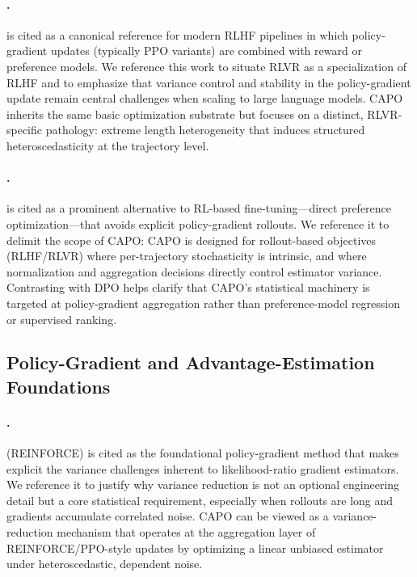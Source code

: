 \paragraph{\citet{ouyang2022instructgpt}.}
\citet{ouyang2022instructgpt} is cited as a canonical reference for modern RLHF pipelines in which policy-gradient updates (typically PPO variants) are combined with reward or preference models.
We reference this work to situate RLVR as a specialization of RLHF and to emphasize that variance control and stability in the policy-gradient update remain central challenges when scaling to large language models.
CAPO inherits the same basic optimization substrate but focuses on a distinct, RLVR-specific pathology: extreme length heterogeneity that induces structured heteroscedasticity at the trajectory level.

\paragraph{\citet{rafailov2023dpo}.}
\citet{rafailov2023dpo} is cited as a prominent alternative to RL-based fine-tuning---direct preference optimization---that avoids explicit policy-gradient rollouts.
We reference it to delimit the scope of CAPO: CAPO is designed for rollout-based objectives (RLHF/RLVR) where per-trajectory stochasticity is intrinsic, and where normalization and aggregation decisions directly control estimator variance.
Contrasting with DPO helps clarify that CAPO's statistical machinery is targeted at policy-gradient aggregation rather than preference-model regression or supervised ranking.

\subsection{Policy-Gradient and Advantage-Estimation Foundations}

\paragraph{\citet{williams1992simple}.}
\citet{williams1992simple} (REINFORCE) is cited as the foundational policy-gradient method that makes explicit the variance challenges inherent to likelihood-ratio gradient estimators.
We reference it to justify why variance reduction is not an optional engineering detail but a core statistical requirement, especially when rollouts are long and gradients accumulate correlated noise.
CAPO can be viewed as a variance-reduction mechanism that operates at the aggregation layer of REINFORCE/PPO-style updates by optimizing a linear unbiased estimator under heteroscedastic, dependent noise.

